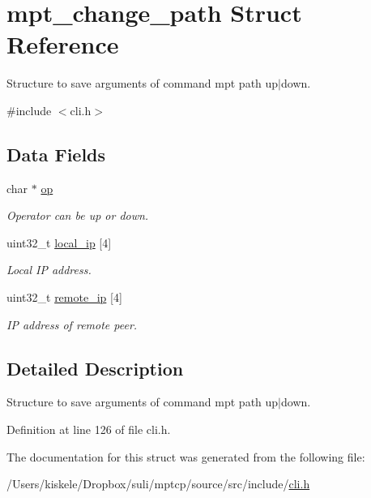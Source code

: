 \hypertarget{structmpt__change__path}{\section{mpt\-\_\-change\-\_\-path Struct Reference}
\label{structmpt__change__path}
}


Structure to save arguments of command mpt path up$|$down.  




{\ttfamily \#include $<$cli.\-h$>$}

\subsection*{Data Fields}
\begin{DoxyCompactItemize}
\item 
\hypertarget{structmpt__change__path_a15206368e0a18f984f0ad6cb10c2995e}{char $\ast$ \hyperlink{structmpt__change__path_a15206368e0a18f984f0ad6cb10c2995e}{op}}\label{structmpt__change__path_a15206368e0a18f984f0ad6cb10c2995e}

\begin{DoxyCompactList}\small\item\em Operator can be up or down. \end{DoxyCompactList}\item 
\hypertarget{structmpt__change__path_ae57a35b29bf4ea942c2dd2e45b6187e2}{uint32\-\_\-t \hyperlink{structmpt__change__path_ae57a35b29bf4ea942c2dd2e45b6187e2}{local\-\_\-ip} \mbox{[}4\mbox{]}}\label{structmpt__change__path_ae57a35b29bf4ea942c2dd2e45b6187e2}

\begin{DoxyCompactList}\small\item\em Local I\-P address. \end{DoxyCompactList}\item 
\hypertarget{structmpt__change__path_a13471409a9146678202e57e726f396d1}{uint32\-\_\-t \hyperlink{structmpt__change__path_a13471409a9146678202e57e726f396d1}{remote\-\_\-ip} \mbox{[}4\mbox{]}}\label{structmpt__change__path_a13471409a9146678202e57e726f396d1}

\begin{DoxyCompactList}\small\item\em I\-P address of remote peer. \end{DoxyCompactList}\end{DoxyCompactItemize}


\subsection{Detailed Description}
Structure to save arguments of command mpt path up$|$down. 

Definition at line 126 of file cli.\-h.



The documentation for this struct was generated from the following file\-:\begin{DoxyCompactItemize}
\item 
/\-Users/kiskele/\-Dropbox/suli/mptcp/source/src/include/\hyperlink{cli_8h}{cli.\-h}\end{DoxyCompactItemize}

